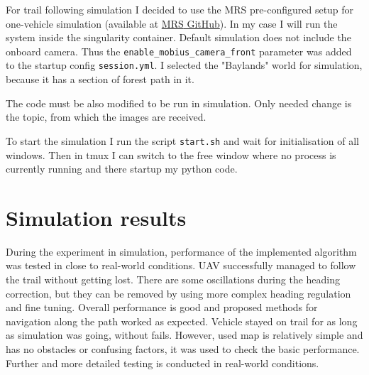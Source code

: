 For trail following simulation I decided to use the \acs{MRS} pre-configured setup for one-vehicle simulation (available at \href{https://github.com/ctu-mrs/simulation}{\acs{MRS} GitHub}). In my case I will run the system inside the singularity container. Default simulation does not include the onboard camera. Thus the \newline \texttt{enable\_mobius\_camera\_front} parameter was added to the startup config \texttt{session.yml}. I selected the "Baylands" world for simulation, because it has a section of forest path in it. 

The code must be also modified to be run in simulation. Only needed change is the topic, from which the images are received.

To start the simulation I run the script \texttt{start.sh} and wait for initialisation of all windows. Then in tmux I can switch to the free window where no process is currently running and there startup my python code. 

\section{Simulation results}

During the experiment in simulation, performance of the implemented algorithm was tested in close to real-world conditions. \acs{UAV} successfully managed to follow the trail without getting lost. There are some oscillations during the heading correction, but they can be removed by using more complex heading regulation and fine tuning. Overall performance is good and proposed methods for navigation along the path worked as expected. Vehicle stayed on trail for as long as simulation was going, without fails. However, used map is relatively simple and has no obstacles or confusing factors, it was used to check the basic performance. Further and more detailed testing is conducted in real-world conditions.


